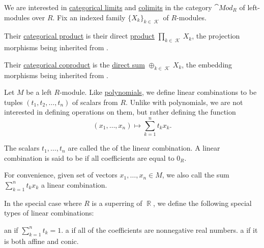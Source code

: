 \begin{proposition}\label{thm:module_categorical_limits}
  We are interested in \hyperref[def:category_of_cones/limit]{categorical limits} and \hyperref[def:category_of_cones/colimit]{colimits} in the category \( \cat{Mod}_R \) of left-modules over \( R \). Fix an indexed family  \( \{ X_k \}_{k \in \mscrK} \) of \( R \)-modules.
  \begin{thmenum}
     Their \hyperref[def:discrete_category_limits]{categorical product} is their direct \hyperref[def:left_module_direct_product]{product} \( \prod_{k \in \mscrK} X_k \), the projection morphisms being inherited from .

     Their \hyperref[def:discrete_category_limits]{categorical coproduct} is the \hyperref[def:group_direct_product]{direct sum} \( \oplus_{k \in \mscrK} X_k \), the embedding morphisms being inherited from .
  \end{thmenum}
\end{proposition}

\begin{definition}\label{def:linear_combination}
  Let \( M \) be a left \( R \)-module. Like \hyperref[def:polynomial]{polynomials}, we define linear combinations to be tuples \( (t_1, t_2, \ldots, t_n) \) of scalars from \( R \). Unlike with polynomials, we are not interested in defining operations on them, but rather defining the function
  \begin{equation}\label{def:linear_combination/function}
    (x_1, \ldots, x_n) \mapsto \sum_{k=1}^n t_k x_k.
  \end{equation}

  The scalars \( t_1, \ldots, t_n \) are called the  of the linear combination. A linear combination is said to be  if all coefficients are equal to \( 0_R \).

  For convenience, given set of vectors \( x_1, \ldots, x_n \in M \), we also call the sum \( \sum_{k=1}^n t_k x_k \) a linear combination.

  In the special case where \( R \) is a superring of \( \BbbR \), we define the following special types of linear combinations:
  \begin{thmenum}
     an  if \( \sum_{k=1}^n t_k = 1 \).
     a  if all of the coefficients are nonnegative real numbers.
     a  if it is both affine and conic.
  \end{thmenum}
\end{definition}

